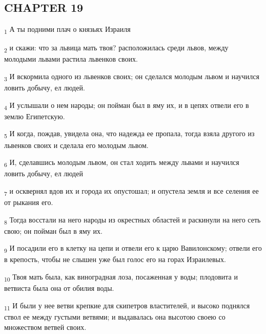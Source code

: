\subsection{CHAPTER 19}
\begin{tcolorbox}
\textsubscript{1} А ты подними плач о князьях Израиля
\end{tcolorbox}
\begin{tcolorbox}
\textsubscript{2} и скажи: что за львица мать твоя? расположилась среди львов, между молодыми львами растила львенков своих.
\end{tcolorbox}
\begin{tcolorbox}
\textsubscript{3} И вскормила одного из львенков своих; он сделался молодым львом и научился ловить добычу, ел людей.
\end{tcolorbox}
\begin{tcolorbox}
\textsubscript{4} И услышали о нем народы; он пойман был в яму их, и в цепях отвели его в землю Египетскую.
\end{tcolorbox}
\begin{tcolorbox}
\textsubscript{5} И когда, пождав, увидела она, что надежда ее пропала, тогда взяла другого из львенков своих и сделала его молодым львом.
\end{tcolorbox}
\begin{tcolorbox}
\textsubscript{6} И, сделавшись молодым львом, он стал ходить между львами и научился ловить добычу, ел людей
\end{tcolorbox}
\begin{tcolorbox}
\textsubscript{7} и осквернял вдов их и города их опустошал; и опустела земля и все селения ее от рыкания его.
\end{tcolorbox}
\begin{tcolorbox}
\textsubscript{8} Тогда восстали на него народы из окрестных областей и раскинули на него сеть свою; он пойман был в яму их.
\end{tcolorbox}
\begin{tcolorbox}
\textsubscript{9} И посадили его в клетку на цепи и отвели его к царю Вавилонскому; отвели его в крепость, чтобы не слышен уже был голос его на горах Израилевых.
\end{tcolorbox}
\begin{tcolorbox}
\textsubscript{10} Твоя мать была, как виноградная лоза, посаженная у воды; плодовита и ветвиста была она от обилия воды.
\end{tcolorbox}
\begin{tcolorbox}
\textsubscript{11} И были у нее ветви крепкие для скипетров властителей, и высоко поднялся ствол ее между густыми ветвями; и выдавалась она высотою своею со множеством ветвей своих.
\end{tcolorbox}
